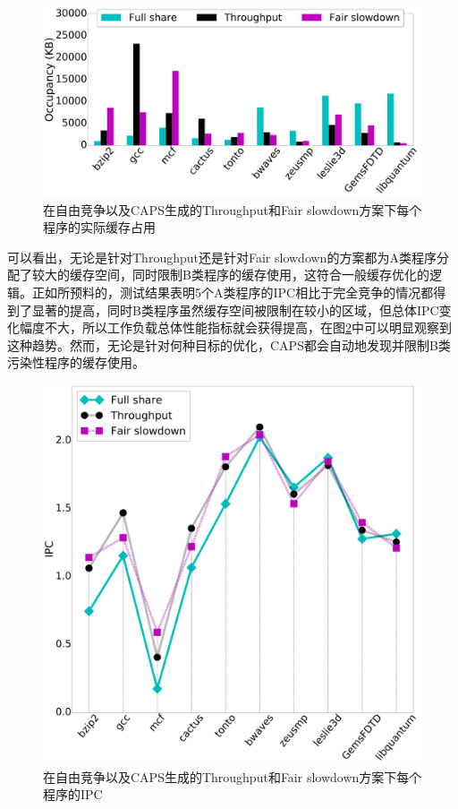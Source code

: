 \begin{figure}[htbp]
\centering
\includegraphics[width=0.9\linewidth]{figures/occ.pdf}
\caption{在自由竞争以及CAPS生成的Throughput和Fair slowdown方案下每个程序的实际缓存占用}
\label{fig:case_occu}
\end{figure} 

可以看出，无论是针对Throughput还是针对Fair slowdown的方案都为A类程序分配了较大的缓存空间，同时限制B类程序的缓存使用，这符合一般缓存优化的逻辑。正如所预料的，测试结果表明5个A类程序的IPC相比于完全竞争的情况都得到了显著的提高，同时B类程序虽然缓存空间被限制在较小的区域，但总体IPC变化幅度不大，所以工作负载总体性能指标就会获得提高，在图\ref{fig:case_ipc}中可以明显观察到这种趋势。然而，无论是针对何种目标的优化，CAPS都会自动地发现并限制B类污染性程序的缓存使用。


\begin{figure}[htbp]
\centering
\includegraphics[width=0.8\columnwidth]{figures/case_ipc.pdf}
\caption{在自由竞争以及CAPS生成的Throughput和Fair slowdown方案下每个程序的IPC}
\label{fig:case_ipc}
\end{figure} 

